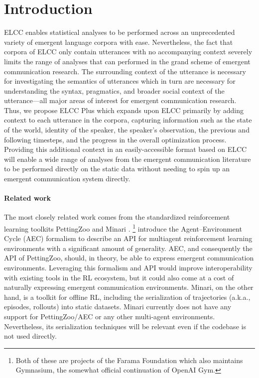 \section{Introduction}

ELCC enables statistical analyses to be performed across an unprecedented variety of emergent language corpora with ease.
Nevertheless, the fact that corpora of ELCC only contain utterances with no accompanying context severely limits the range of analyses that can performed in the grand scheme of emergent communication research.
The surrounding context of the utterance is necessary for investigating the semantics of utterances which in turn are necessary for understanding the syntax, pragmatics, and broader social context of the utterance---all major areas of interest for emergent communication research.
Thus, we propose ELCC Plus which expands upon ELCC primarily by adding context to each utterance in the corpora, capturing information such as the
  state of the world,
  identity of the speaker,
  the speaker's observation,
  the previous and following timesteps,
  and the progress in the overall optimization process.
Providing this additional context in an easily-accessible format based on ELCC will enable a wide range of analyses from the emergent communication literature to be performed directly on the static data without needing to spin up an emergent communication system directly.


\paragraph{Related work}
The most closely related work comes from the standardized reinforcement learning toolkits PettingZoo \citep{terry2021pettingzoo} and Minari \citep{minari}.
  \unskip\footnote{Both of these are projects of the Farama Foundation which also maintains Gymnasium, the somewhat official continuation of OpenAI Gym.}
\citet{terry2021pettingzoo} introduce the Agent--Environment Cycle (AEC) formalism to describe an API for multiagent reinforcement learning environments with a significant amount of generality.
AEC, and consequently the API of PettingZoo, should, in theory, be able to express emergent communication environments.
Leveraging this formalism and API would improve interoperability with existing tools in the RL ecosystem, but it could also come at a cost of naturally expressing emergent communication environments.
Minari, on the other hand, is a toolkit for offline RL, including the serialization of trajectories (a.k.a., episodes, rollouts) into static datasets.
Minari currently does not have any support for PettingZoo/AEC or any other multi-agent environments.
Nevertheless, its serialization techniques will be relevant even if the codebase is not used directly.



